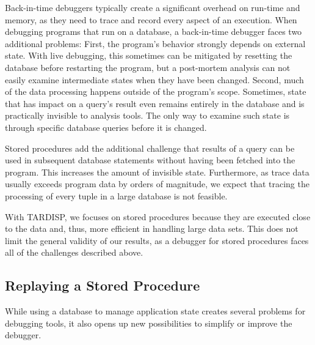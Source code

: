 \documentclass[english,conference,final]{IEEEtran}
\newcommand{\tool}{TAR\-DISP}
\begin{document}
Back-in-time debuggers typically create a significant overhead on run-time and memory, as they need to trace and record every aspect of an execution.
When debugging programs that run on a database, a back-in-time debugger faces two additional problems:
First, the program's behavior strongly depends on external state.
With live debugging, this sometimes can be mitigated by resetting the database before restarting the program, but a post-mortem analysis can not easily examine intermediate states when they have been changed.
Second, much of the data processing happens outside of the program's scope.
Sometimes, state that has impact on a query's result even remains entirely in the database and is practically invisible to analysis tools.
The only way to examine such state is through specific database queries before it is changed.

Stored procedures add the additional challenge that results of a query can be used in subsequent database statements without having been fetched into the program.
This increases the amount of invisible state.
Furthermore, as trace data usually exceeds program data by orders of magnitude, we expect that tracing the processing of every tuple in a large database is not feasible.

With \tool, we focuses on stored procedures because they are executed close to the data and, thus, more efficient in handling large data sets.
This does not limit the general validity of our results, as a debugger for stored procedures faces all of the challenges described above.

\subsection{Replaying a Stored Procedure}

While using a database to manage application state creates several problems for debugging tools, it also opens up new possibilities to simplify or improve the debugger.
\end{document}
